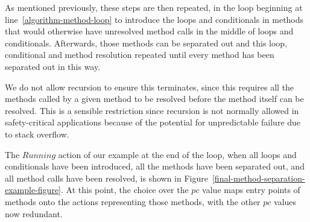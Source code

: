 As mentioned previously, these steps are then repeated, in the loop
beginning at line~\ref{algorithm-method-loop} to introduce the loops
and conditionals in methods that would otherwise have unresolved
method calls in the middle of loops and conditionals.
Afterwards, those methods can be separated out and this loop, conditional and
method resolution repeated until every method has been separated out
in this way.

We do not allow recursion to ensure this terminates, since this
requires all the methods called by a given method to be resolved
before the method itself can be resolved.
This is a sensible restriction since recursion is not normally allowed
in safety-critical applications because of the potential for
unpredictable failure due to stack overflow.

The $Running$ action of our example at the end of the loop, when all
loops and conditionals have been introduced, all the methods have been
separated out, and all method calls have been resolved, is shown in
Figure~\ref{final-method-separation-example-figure}.
At this point, the choice over the $pc$ value maps entry points of
methods onto the actions representing those methods, with the other
$pc$ values now redundant.


